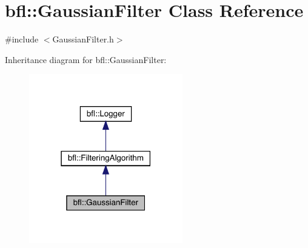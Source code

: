\hypertarget{classbfl_1_1GaussianFilter}{}\section{bfl\+:\+:Gaussian\+Filter Class Reference}
\label{classbfl_1_1GaussianFilter}


{\ttfamily \#include $<$Gaussian\+Filter.\+h$>$}



Inheritance diagram for bfl\+:\+:Gaussian\+Filter\+:
\nopagebreak
\begin{figure}[H]
\begin{center}
\leavevmode
\includegraphics[width=190pt]{classbfl_1_1GaussianFilter__inherit__graph}
\end{center}
\end{figure}
